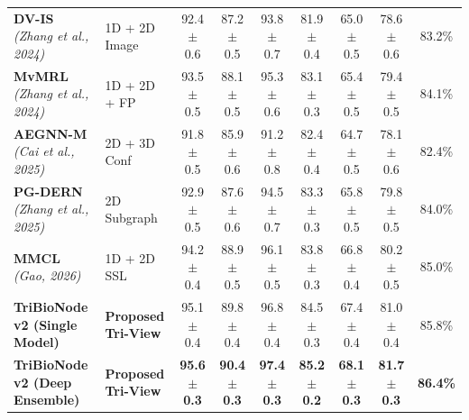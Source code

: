 \documentclass[10pt,twocolumn]{article}
\begin{document}
\begin{table}[!t]
{\begin{tabular}{llccccccc}
\textbf{DV-IS} \textit{(Zhang et al., 2024)} \cite{zhang2024dual} & 1D + 2D Image & 92.4 $\pm$ 0.6 & 87.2 $\pm$ 0.5 & 93.8 $\pm$ 0.7 & 81.9 $\pm$ 0.4 & 65.0 $\pm$ 0.5 & 78.6 $\pm$ 0.6 & 83.2\% \\
\textbf{MvMRL} \textit{(Zhang et al., 2024)} \cite{zhang2024mvmrl} & 1D + 2D + FP & 93.5 $\pm$ 0.5 & 88.1 $\pm$ 0.5 & 95.3 $\pm$ 0.6 & 83.1 $\pm$ 0.3 & 65.4 $\pm$ 0.5 & 79.4 $\pm$ 0.5 & 84.1\% \\
\textbf{AEGNN-M} \textit{(Cai et al., 2025)} \cite{cai2025aegnn} & 2D + 3D Conf & 91.8 $\pm$ 0.5 & 85.9 $\pm$ 0.6 & 91.2 $\pm$ 0.8 & 82.4 $\pm$ 0.4 & 64.7 $\pm$ 0.5 & 78.1 $\pm$ 0.6 & 82.4\% \\
\textbf{PG-DERN} \textit{(Zhang et al., 2025)} \cite{zhang2025property} & 2D Subgraph & 92.9 $\pm$ 0.5 & 87.6 $\pm$ 0.6 & 94.5 $\pm$ 0.7 & 83.3 $\pm$ 0.3 & 65.8 $\pm$ 0.5 & 79.8 $\pm$ 0.5 & 84.0\% \\
\textbf{MMCL} \textit{(Gao, 2026)} \cite{gao2026mmcl} & 1D + 2D SSL & 94.2 $\pm$ 0.4 & 88.9 $\pm$ 0.5 & 96.1 $\pm$ 0.5 & 83.8 $\pm$ 0.3 & 66.8 $\pm$ 0.4 & 80.2 $\pm$ 0.5 & 85.0\% \\
\midrule
\textbf{TriBioNode v2 (Single Model)} & \textbf{Proposed Tri-View} & 95.1 $\pm$ 0.4 & 89.8 $\pm$ 0.4 & 96.8 $\pm$ 0.4 & 84.5 $\pm$ 0.3 & 67.4 $\pm$ 0.4 & 81.0 $\pm$ 0.4 & 85.8\% \\
\textbf{TriBioNode v2 (Deep Ensemble)} & \textbf{Proposed Tri-View} & \textbf{95.6 $\pm$ 0.3} & \textbf{90.4 $\pm$ 0.3} & \textbf{97.4 $\pm$ 0.3} & \textbf{85.2 $\pm$ 0.2} & \textbf{68.1 $\pm$ 0.3} & \textbf{81.7 $\pm$ 0.3} & \textbf{86.4\%} \\
\bottomrule
\end{tabular}}
\end{table}
\end{document}
